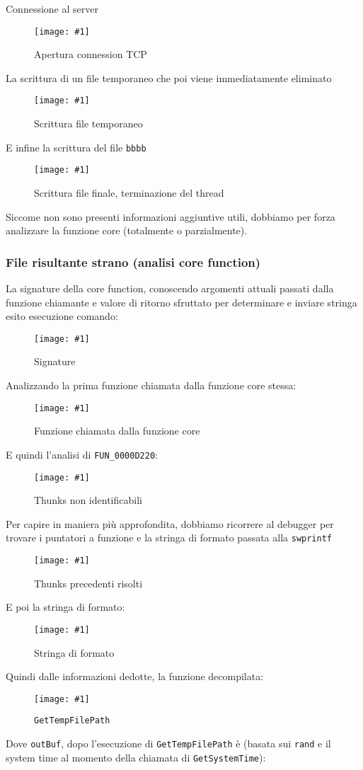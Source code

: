 \documentclass[
    a4paper, %
    11pt %
]{article}
\newcommand{\pic}[4]{\begin{figure}[H]
            \centering
            \texttt{[image: \#1]}
            \caption{#2}
            \label{fig:#1}
            \end{figure}}
\begin{document}
            Connessione al server
            \pic{adv_8_pm1}{Apertura connession TCP}{18cm}{2cm}

            La scrittura di un file temporaneo che poi viene immediatamente eliminato
            \pic{adv_8_pm2}{Scrittura file temporaneo}{10cm}{3cm}

            E infine la scrittura del file \texttt{bbbb}
            \pic{adv_8_pm3}{Scrittura file finale, terminazione del thread}{15cm}{8cm}

            Siccome non sono presenti informazioni aggiuntive utili, dobbiamo per forza analizzare la funzione
            core (totalmente o parzialmente).

            \subsubsection{File risultante strano (analisi core function)}

            La signature della core function, conoscendo argomenti attuali passati dalla funzione chiamante
            e valore di ritorno sfruttato per determinare e inviare stringa esito esecuzione comando:
            \pic{adv_8_core_sign}{Signature}{10cm}{1.5cm}

            Analizzando la prima funzione chiamata dalla funzione core stessa:

            \pic{adv_8_core_firstpass}{Funzione chiamata dalla funzione core}{10cm}{2cm}

            E quindi l'analisi di \texttt{FUN\_0000D220}:
            
            \pic{adv_8_core_d220}{Thunks non identificabili}{15cm}{8cm}

            Per capire in maniera più approfondita, dobbiamo ricorrere al debugger per trovare i puntatori
            a funzione e la stringa di formato passata alla \texttt{swprintf}

            \pic{adv_8_core_d220_dbg}{Thunks precedenti risolti}{15.5cm}{3cm}

            E poi la stringa di formato:

            \pic{adv_8_core_d220_fmt}{Stringa di formato}{8.5cm}{2cm}

            Quindi dalle informazioni dedotte, la funzione decompilata:

            \pic{adv_8_core_d220_ok}{\texttt{GetTempFilePath}}{18cm}{13cm}

            Dove \texttt{outBuf}, dopo l'esecuzione di \texttt{GetTempFilePath} è (basata sui \texttt{rand} e
            il system time al momento della chiamata di \texttt{GetSystemTime}):
\end{document}
